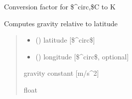 \documentclass[letterpaper,10pt,english]{sphinxmanual}
\begin{document}
\begin{fulllineitems}
\label{\detokenize{users_guide:util_subs.CtoK}}
\pysigstartsignatures
{}
\pysigstopsignatures
\sphinxAtStartPar
Conversion factor for \$\textasciicircum{}circ,\$C to K

\end{fulllineitems}


\begin{fulllineitems}
\label{\detokenize{users_guide:util_subs.gc}}
\pysigstartsignatures
{}
\pysigstopsignatures
\sphinxAtStartPar
Computes gravity relative to latitude
\begin{quote}\begin{description}
\begin{itemize}
\item {} 
\sphinxAtStartPar
{} () \textendash{} latitude {[}\$\textasciicircum{}circ\${]}

\item {} 
\sphinxAtStartPar
{} () \textendash{} longitude {[}\$\textasciicircum{}circ\$, optional{]}

\end{itemize}

\sphinxAtStartPar
{} \textendash{} gravity constant {[}m/s\textasciicircum{}2{]}

\sphinxAtStartPar
float

\end{description}\end{quote}

\end{fulllineitems}

\end{document}
